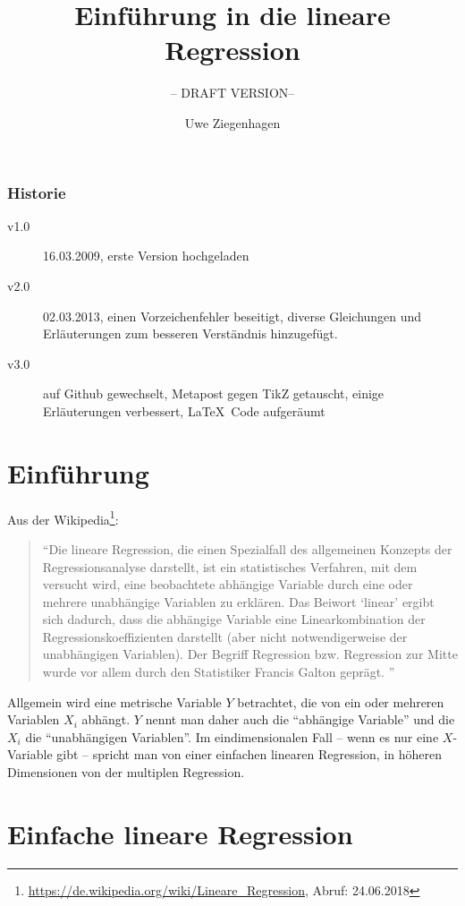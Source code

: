 \documentclass[ngerman, 12pt]{scrartcl}
\title{Einführung in die lineare Regression}
\subtitle{-- DRAFT VERSION--}
\author{Uwe Ziegenhagen}
\begin{document}
\maketitle

\subsubsection*{Historie}

\begin{description}
\item[v1.0] 16.03.2009, erste Version hochgeladen
\item[v2.0] 02.03.2013, einen Vorzeichenfehler beseitigt, diverse Gleichungen und Erläuterungen zum besseren Verständnis hinzugefügt.
\item [v3.0] auf Github gewechselt, Metapost gegen TikZ getauscht, einige Erläuterungen verbessert, \LaTeX\ Code aufgeräumt
\end{description}

\section{Einführung}

Aus der Wikipedia\footnote{\url{https://de.wikipedia.org/wiki/Lineare_Regression}, Abruf: 24.06.2018}: 

\begin{quote}
\enquote{Die lineare Regression, die einen Spezialfall des allgemeinen Konzepts der Regressionsanalyse darstellt, ist ein statistisches Verfahren, mit dem versucht wird, eine beobachtete abhängige Variable durch eine oder mehrere unabhängige Variablen zu erklären. Das Beiwort \enquote{linear} ergibt sich dadurch, dass die abhängige Variable eine Linearkombination der Regressionskoeffizienten darstellt (aber nicht notwendigerweise der unabhängigen Variablen). Der Begriff Regression bzw. Regression zur Mitte wurde vor allem durch den Statistiker Francis Galton geprägt. 
}\end{quote}

Allgemein wird eine metrische Variable $Y$ betrachtet, die von ein oder mehreren Variablen $X_i$ abhängt. $Y$ nennt man daher auch die \enquote{abhängige Variable} und die $X_i$ die \enquote{unabhängigen Variablen}.  Im eindimensionalen Fall -- wenn es nur eine $X$-Variable gibt -- spricht man von einer einfachen linearen Regression, in höheren Dimensionen von der multiplen Regression.

\section{Einfache lineare Regression}
\end{document}
